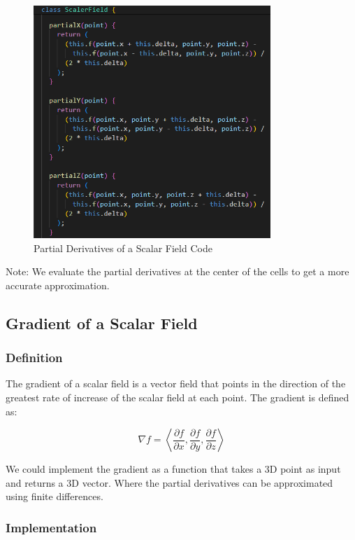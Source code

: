 \documentclass[12pt]{article}
\begin{document}
\begin{figure}[H]
    \centering
    \includegraphics[width=0.8\textwidth]{images/partial.png}
    \caption{Partial Derivatives of a Scalar Field Code\cite{El-Deeb_PEU-218_Stokes_Threejs}}
\end{figure}

Note: We evaluate the partial derivatives at the center of the cells to get a more accurate approximation.

\subsection{Gradient of a Scalar Field}

\subsubsection{Definition}

The gradient of a scalar field is a vector field that points in the direction of the greatest rate of increase of the scalar field at each point. The gradient is defined as:

\[
    \nabla f = \left\langle \frac{\partial f}{\partial x}, \frac{\partial f}{\partial y}, \frac{\partial f}{\partial z}\right\rangle
\]

We could implement the gradient as a function that takes a 3D point as input and returns a 3D vector.
Where the partial derivatives can be approximated using finite differences.

\subsubsection{Implementation}
\end{document}
